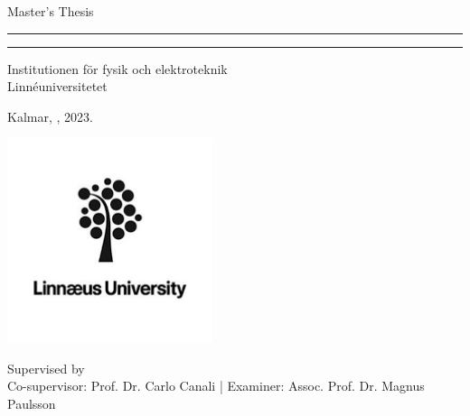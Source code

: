 \begin{titlepage}
\begin{center}
    
\LARGE
Master's Thesis
    
\vspace{0.5cm}
      
\rule{\textwidth}{1.5pt}
\LARGE
\textbf{\mytitle}
\rule{\textwidth}{1.5pt}
   
\vspace{0.5cm}
      
\large
Institutionen för fysik och elektroteknik \\
Linnéuniversitetet 

\vfill

\Large
\textbf{\myname}

\vfill

\large
Kalmar, \mydate, 2023.
      
\vfill

\includegraphics[width = 0.45\textwidth]{imgs/logo-lnu.png}

\vfill

\normalsize

Supervised by \mysupervisor \\
Co-supervisor: Prof. Dr. Carlo Canali | 
Examiner: Assoc. Prof. Dr. Magnus Paulsson

\end{center}
\end{titlepage}